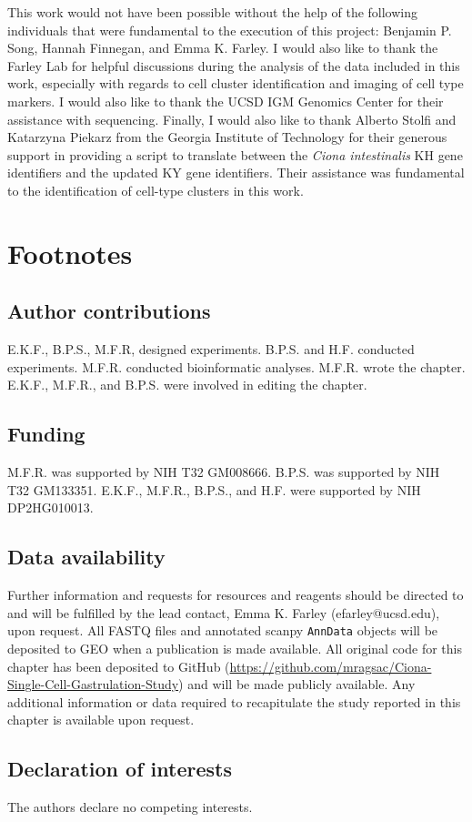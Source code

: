This work would not have been possible without the help of the following individuals that were fundamental to the execution of this project: Benjamin P. Song, Hannah Finnegan, and Emma K. Farley. I would also like to thank the Farley Lab for helpful discussions during the analysis of the data included in this work, especially with regards to cell cluster identification and imaging of cell type markers. I would also like to thank the UCSD IGM Genomics Center for their assistance with sequencing. Finally, I would also like to thank Alberto Stolfi and Katarzyna Piekarz from the Georgia Institute of Technology for their generous support in providing a script to translate between the \textit{Ciona intestinalis} KH gene identifiers and the updated KY gene identifiers. Their assistance was fundamental to the identification of cell-type clusters in this work.

\section{Footnotes}

\subsection{Author contributions}
E.K.F., B.P.S., M.F.R, designed experiments. B.P.S. and H.F. conducted experiments. M.F.R. conducted bioinformatic analyses. M.F.R. wrote the chapter. E.K.F., M.F.R., and B.P.S. were involved in editing the chapter. 

\subsection{Funding}
M.F.R. was supported by NIH T32 GM008666. B.P.S. was supported by NIH T32 GM133351. E.K.F., M.F.R., B.P.S., and H.F. were supported by NIH DP2HG010013.

\subsection{Data availability}
Further information and requests for resources and reagents should be directed to and will be fulfilled by the lead contact, Emma K. Farley (efarley@ucsd.edu), upon request. All FASTQ files and annotated scanpy \verb|AnnData| objects will be deposited to GEO when a publication is made available. All original code for this chapter has been deposited to GitHub (\url{https://github.com/mragsac/Ciona-Single-Cell-Gastrulation-Study}) and will be made publicly available. Any additional information or data required to recapitulate the study reported in this chapter is available upon request.

\subsection{Declaration of interests}
The authors declare no competing interests.
